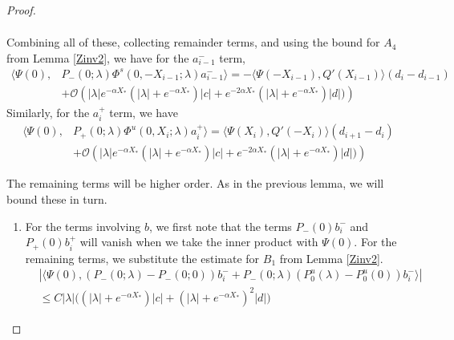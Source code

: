 \documentclass[thesis.tex]{subfiles}
\begin{document}
\begin{lemma}
\begin{proof}
\begin{enumerate}
\begin{align*}
\end{align*}
Combining all of these, collecting remainder terms, and using the bound for $A_4$ from Lemma \ref{Zinv2}, we have for the $a_{i-1}^-$ term,
\begin{align*}
\langle \Psi(0), &P_-(0; \lambda) \Phi^s(0, -X_{i-1}; \lambda) a_{i-1}^- \rangle = -\langle \Psi(-X_{i-1}), Q'(X_{i-1}) \rangle (d_i - d_{i-1} ) \\
&+ \mathcal{O} \left( |\lambda|e^{-\alpha X_*}(|\lambda| + e^{-\alpha X_*})|c| + e^{-2 \alpha X_*} (|\lambda| + e^{-\alpha X_*}) |d| ) \right)
\end{align*}
Similarly, for the $a_i^+$ term, we have
\begin{align*}
\langle \Psi(0), &P_+(0; \lambda) \Phi^u(0, X_i; \lambda) a_i^+ \rangle = \langle \Psi(X_i), Q'(-X_i) \rangle (d_{i+1} - d_i ) \\
&+ \mathcal{O} \left( |\lambda|e^{-\alpha X_*}(|\lambda| + e^{-\alpha X_*})|c| + e^{-2 \alpha X_*} (|\lambda| + e^{-\alpha X_*}) |d| ) \right)
\end{align*}
\end{enumerate}

The remaining terms will be higher order. As in the previous lemma, we will bound these in turn.

\begin{enumerate}

\item For the terms involving $b$, we first note that the terms $P_-(0) b_i^-$ and $P_+(0)b_i^+$ will vanish when we take the inner product with $\Psi(0)$. For the remaining terms, we substitute the estimate for $B_1$ from Lemma \ref{Zinv2}.
\begin{align*}
&|\langle \Psi(0), (P_-(0; \lambda) - P_-(0; 0))b_i^- + P_-(0; \lambda)(P_0^u(\lambda) - P_0^u(0))b_i^- \rangle | \\
&\leq C |\lambda| \Big( (|\lambda| + e^{-\alpha X_*})|c| + (|\lambda| + e^{-\alpha X_*})^2 |d| \Big)
\end{align*}


\end{enumerate}
\end{proof}
\end{lemma}
\end{document}
